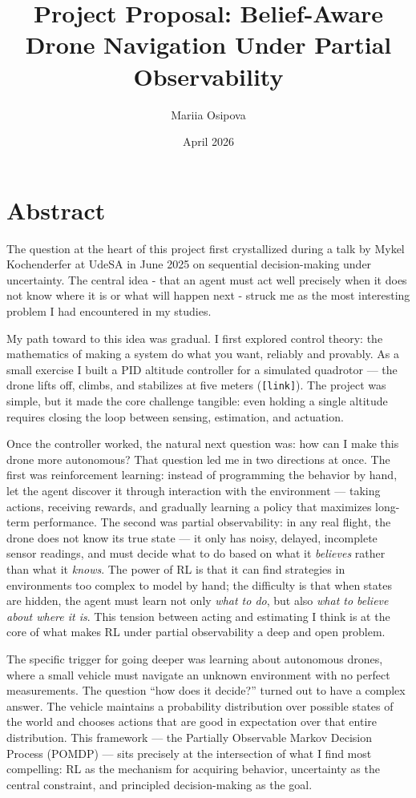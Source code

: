 \documentclass[11pt]{article}
\title{Project Proposal: Belief-Aware Drone Navigation Under Partial Observability}
\author{Mariia Osipova}
\date{April 2026}
\begin{document}
\maketitle
\thispagestyle{empty}

\section*{Abstract}

The question at the heart of this project first crystallized during a talk by Mykel Kochenderfer at UdeSA in June 2025 on sequential decision-making under uncertainty. The central idea - that an agent must act well precisely when it does not know where it is or what will happen next - struck me as the most interesting problem I had encountered in my studies.

My path toward to this idea was gradual. I first explored control theory: the mathematics of making a system do what you want, reliably and provably. As a small exercise I built a PID altitude controller for a simulated quadrotor — the drone lifts off, climbs, and stabilizes at five meters (\texttt{[link]}). The project was simple, but it made the core challenge tangible: even holding a single altitude requires closing the loop between sensing, estimation, and actuation.


Once the controller worked, the natural next question was: how can I make
this drone more autonomous? That question led me in two directions at once. The first was reinforcement learning: instead of
programming the behavior by hand, let the agent discover it through
interaction with the environment — taking actions, receiving rewards, and
gradually learning a policy that maximizes long-term performance. The second
was partial observability: in any real flight, the drone does not know its
true state — it only has noisy, delayed, incomplete sensor readings, and must
decide what to do based on what it \emph{believes} rather than what it
\emph{knows}. The power of RL is that it can find strategies in environments
too complex to model by hand; the difficulty is that when states are hidden,
the agent must learn not only \emph{what to do}, but also \emph{what to believe
about where it is}. This tension between acting and estimating I think is at the core of what makes RL under partial observability a deep and
open problem.

The specific trigger for going deeper was learning about autonomous drones, where a small vehicle must navigate an unknown environment with no perfect measurements. The question ``how does it decide?'' turned out to have a complex answer. The vehicle maintains a probability distribution over possible states of the world and chooses actions that are good in expectation over that entire distribution. This framework — the Partially Observable Markov Decision Process (POMDP) — sits precisely at the intersection of what I find most compelling: RL as the mechanism for acquiring behavior, uncertainty as the central constraint, and principled decision-making as the goal.
\end{document}
